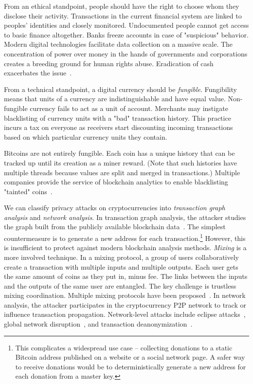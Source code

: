 From an ethical standpoint, people should have the right to choose whom they disclose their activity.
Transactions in the current financial system are linked to peoples' identities and closely monitored.
Undocumented people cannot get access to basic finance altogether.
Banks freeze accounts in case of "suspicious" behavior.
Modern digital technologies facilitate data collection on a massive scale.
The concentration of power over money in the hands of governments and corporations creates a breeding ground for human rights abuse.
Eradication of cash exacerbates the issue~\cite{Brito2019}.

From a technical standpoint, a digital currency should be \textit{fungible}.
Fungibility means that units of a currency are indistinguishable and have equal value.
Non-fungible currency fails to act as a unit of account.
Merchants may instigate blacklisting of currency units with a "bad" transaction history.
This practice incurs a tax on everyone as receivers start discounting incoming transactions based on which particular currency units they contain.

Bitcoins are not entirely fungible.
Each coin has a unique history that can be tracked up until its creation as a miner reward.
(Note that such histories have multiple threads because values are split and merged in transactions.)
Multiple companies provide the service of blockchain analytics to enable blacklisting "tainted" coins~\cite{Elliptic, Chainalysis}.

We can classify privacy attacks on cryptocurrencies into \textit{transaction graph analysis} and \textit{network analysis}.
In transaction graph analysis, the attacker studies the graph built from the publicly available blockchain data~\cite{Reid2011, Androulaki2013, Meiklejohn2013, Ober2013, Ron2013}.
The simplest countermeasure is to generate a new address for each transaction.\footnote{This complicates a widespread use case -- collecting donations to a static Bitcoin address published on a website or a social network page. A safer way to receive donations would be to deterministically generate a new address for each donation from a master key.}
However, this is insufficient to protect against modern blockchain analysis methods.
\textit{Mixing} is a more involved technique.
In a mixing protocol, a group of users collaboratively create a transaction with multiple inputs and multiple outputs.
Each user gets the same amount of coins as they put in, minus fee.
The links between the inputs and the outputs of the same user are entangled.
The key challenge is trustless mixing coordination.
Multiple mixing protocols have been proposed~\cite{Maxwell2013, Bonneau2014, Ruffing2014, Valenta2015}.
In network analysis, the attacker participates in the cryptocurrency P2P network to track or influence transaction propagation.
Network-level attacks include eclipse attacks~\cite{Marcus2018, Henningsen2019}, global network disruption~\cite{Apostolaki2017}, and transaction deanonymization~\cite{Biryukov2014}.


